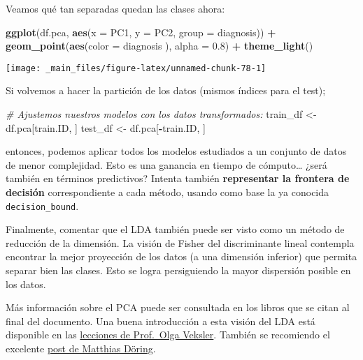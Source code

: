 \documentclass[]{book}
\newenvironment{Shaded}{\begin{snugshade}}{\end{snugshade}}
\newcommand{\CommentTok}[1]{\textcolor[rgb]{0.56,0.35,0.01}{\textit{#1}}}
\newcommand{\DataTypeTok}[1]{\textcolor[rgb]{0.13,0.29,0.53}{#1}}
\newcommand{\FloatTok}[1]{\textcolor[rgb]{0.00,0.00,0.81}{#1}}
\newcommand{\KeywordTok}[1]{\textcolor[rgb]{0.13,0.29,0.53}{\textbf{#1}}}
\newcommand{\NormalTok}[1]{#1}
\newcommand{\OperatorTok}[1]{\textcolor[rgb]{0.81,0.36,0.00}{\textbf{#1}}}
\newcommand{\StringTok}[1]{\textcolor[rgb]{0.31,0.60,0.02}{#1}}
\begin{document}
Veamos qué tan separadas quedan las clases ahora:

\begin{Shaded}
\begin{Highlighting}[]
\KeywordTok{ggplot}\NormalTok{(df.pca,  }\KeywordTok{aes}\NormalTok{(}\DataTypeTok{x =}\NormalTok{ PC1, }\DataTypeTok{y =}\NormalTok{ PC2, }\DataTypeTok{group =}\NormalTok{ diagnosis)) }\OperatorTok{+}
\StringTok{  }\KeywordTok{geom_point}\NormalTok{(}\KeywordTok{aes}\NormalTok{(}\DataTypeTok{color =}\NormalTok{ diagnosis ), }\DataTypeTok{alpha =} \FloatTok{0.8}\NormalTok{) }\OperatorTok{+}
\StringTok{  }\KeywordTok{theme_light}\NormalTok{()}
\end{Highlighting}
\end{Shaded}

\begin{center}\texttt{[image: \_main\_files/figure-latex/unnamed-chunk-78-1]} \end{center}

Si volvemos a hacer la partición de los datos (mismos índices para el test);

\begin{Shaded}
\begin{Highlighting}[]
\CommentTok{# Ajustemos nuestros modelos con los datos transformados:}
\NormalTok{train_df <-}\StringTok{ }\NormalTok{df.pca[train.ID, ]}
\NormalTok{test_df <-}\StringTok{ }\NormalTok{df.pca[}\OperatorTok{-}\NormalTok{train.ID, ]}
\end{Highlighting}
\end{Shaded}

entonces, podemos aplicar todos los modelos estudiados a un conjunto de datos de menor complejidad. Esto es una ganancia en tiempo de cómputo\ldots{} ¿será también en términos predictivos? Intenta también \textbf{representar la frontera de decisión} correspondiente a cada método, usando como base la ya conocida \texttt{decision\_bound}.

Finalmente, comentar que el LDA también puede ser visto como un método de reducción de la dimensión. La visión de Fisher del discriminante lineal contempla encontrar la mejor proyección de los datos (a una dimensión inferior) que permita separar bien las clases. Esto se logra persiguiendo la mayor dispersión posible en los datos.

Más información sobre el PCA puede ser consultada en los libros que se citan al final del documento. Una buena introducción a esta visión del LDA está disponible en las \href{https://www.csd.uwo.ca/~olga/Courses/CS434a_541a/Lecture8.pdf}{lecciones de Prof.~Olga Veksler}. También se recomiendo el excelente \href{https://www.datascienceblog.net/post/machine-learning/linear-discriminant-analysis/}{post de Matthias Döring}.
\end{document}
